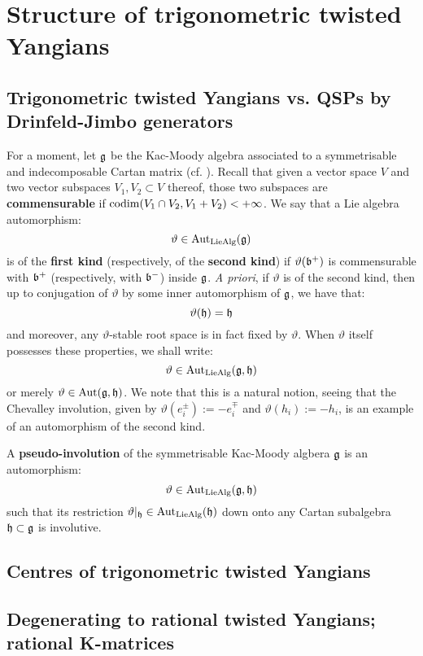 \section{Structure of trigonometric twisted Yangians}
    \subsection{Trigonometric twisted Yangians vs. QSPs by Drinfeld-Jimbo generators}
        For a moment, let $\mathfrak{g}$ be the Kac-Moody algebra associated to a symmetrisable and indecomposable Cartan matrix (cf. \cite[Chapter 1]{kac_infinite_dimensional_lie_algebras}). Recall that given a vector space $V$ and two vector subspaces $V_1, V_2 \subset V$ thereof, those two subspaces are \textbf{commensurable} if $\operatorname{codim}(V_1 \cap V_2, V_1 + V_2) < +\infty$. We say that a Lie algebra automorphism:
            $$\vartheta \in \operatorname{Aut}_{\mathrm{Lie}\mathrm{Alg}}(\mathfrak{g})$$
        is of the \textbf{first kind} (respectively, of the \textbf{second kind}) if $\vartheta(\mathfrak{b}^+)$ is commensurable with $\mathfrak{b}^+$ (respectively, with $\mathfrak{b}^-$) inside $\mathfrak{g}$. \textit{A priori}, if $\vartheta$ is of the second kind, then up to conjugation of $\vartheta$ by some inner automorphism of $\mathfrak{g}$, we have that:
            $$\vartheta(\mathfrak{h}) = \mathfrak{h}$$
        and moreover, any $\vartheta$-stable root space is in fact fixed by $\vartheta$. When $\vartheta$ itself possesses these properties, we shall write:
            $$\vartheta \in \operatorname{Aut}_{\mathrm{Lie}\mathrm{Alg}}(\mathfrak{g}, \mathfrak{h})$$
        or merely $\vartheta \in \operatorname{Aut}(\mathfrak{g}, \mathfrak{h})$. We note that this is a natural notion, seeing that the Chevalley involution, given by $\vartheta(e_i^{\pm}) := -e_i^{\mp}$ and $\vartheta(h_i) := -h_i$, is an example of an automorphism of the second kind. 
        \begin{definition} \label{def: pseudo_involutions}
            A \textbf{pseudo-involution} of the symmetrisable Kac-Moody algbera $\mathfrak{g}$ is an automorphism:
                $$\vartheta \in \operatorname{Aut}_{\mathrm{Lie}\mathrm{Alg}}(\mathfrak{g}, \mathfrak{h})$$
            such that its restriction $\vartheta|_{\mathfrak{h}} \in \operatorname{Aut}_{\mathrm{Lie}\mathrm{Alg}}(\mathfrak{h})$ down onto any Cartan subalgebra $\mathfrak{h} \subset \mathfrak{g}$ is involutive. 
        \end{definition}

    \subsection{Centres of trigonometric twisted Yangians}

    \subsection{Degenerating to rational twisted Yangians; rational K-matrices}
